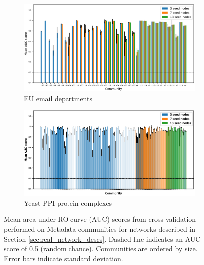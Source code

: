 \documentclass[manuscript, proceedings]{acmart}
\begin{document}
\begin{figure}
     \centering
    \begin{subfigure}[b]{0.48\textwidth}
        \centering
        \includegraphics[width=\textwidth]{images/eu_roc_scores.eps}
        \caption{EU email departments}
    \end{subfigure}
    \begin{subfigure}[b]{0.48\textwidth}
        \centering
        \includegraphics[width=\textwidth]{images/yeast_ppi_roc_scores.eps}
        \caption{Yeast PPI protein complexes}
    \end{subfigure}
    \caption{Mean area under RO curve (AUC) scores from cross-validation performed on Metadata communities for networks described in Section \ref{sec:real_network_descs}.
    Dashed line indicates an AUC score of 0.5 (random chance).
    Communities are ordered by size.
    Error bars indicate standard deviation.
    }
    \label{fig:real_network_results}
\end{figure}
\end{document}
